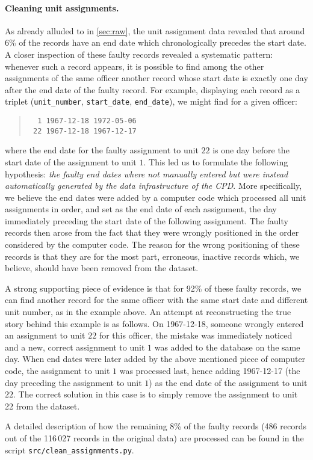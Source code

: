 \paragraph{Cleaning unit assignments.}
As already alluded to in \cref{sec:raw}, the unit assignment data revealed that
around 6\% of the records have an end date which chronologically precedes the
start date. A closer inspection of these faulty records revealed a systematic
pattern: whenever such a record appears, it is possible to find among the other
assignments of the same officer another record whose start date is exactly one
day after the end date of the faulty record. For example, displaying each
record as a triplet (\texttt{unit\_number}, \texttt{start\_date},
\texttt{end\_date}), we might find for a given officer:
\begin{quote}
\begin{verbatim}
  1 1967-12-18 1972-05-06
 22 1967-12-18 1967-12-17
\end{verbatim}
\end{quote}
where the end date for the faulty assignment to unit $22$ is one day before the
start date of the assignment to unit $1$. This led us to formulate the
following hypothesis: \emph{the faulty end dates where not manually entered but
were instead automatically generated by the data infrastructure of the CPD}.
More specifically, we believe the end dates were added by a computer code which
processed all unit assignments in order, and set as the end date of each
assignment, the day immediately preceding the start date of the following
assignment. The faulty records then arose from the fact that they were wrongly
positioned in the order considered by the computer code. The reason for the
wrong positioning of these records is that they are for the most part,
erroneous, inactive records which, we believe, should have been removed from
the dataset.

A strong supporting piece of evidence is that for 92\% of these faulty records,
we can find another record for the same officer with the same start date and
different unit number, as in the example above. An attempt at reconstructing the
true story behind this example is as follows. On 1967-12-18, someone
wrongly entered an assignment to unit $22$ for this officer, the mistake was
immediately noticed and a new, correct assignment to unit $1$ was added to the
database on the same day. When end dates were later added by the above
mentioned piece of computer code, the assignment to unit $1$ was processed
last, hence adding 1967-12-17 (the day preceding the assignment to unit $1$) as
the end date of the assignment to unit $22$. The correct solution in this case
is to simply remove the assignment to unit 22 from the dataset.

A detailed description of how the remaining 8\% of the faulty records (486
records out of the 116\,027 records in the original data) are processed can be
found in the script \texttt{src/clean\_assignments.py}.

